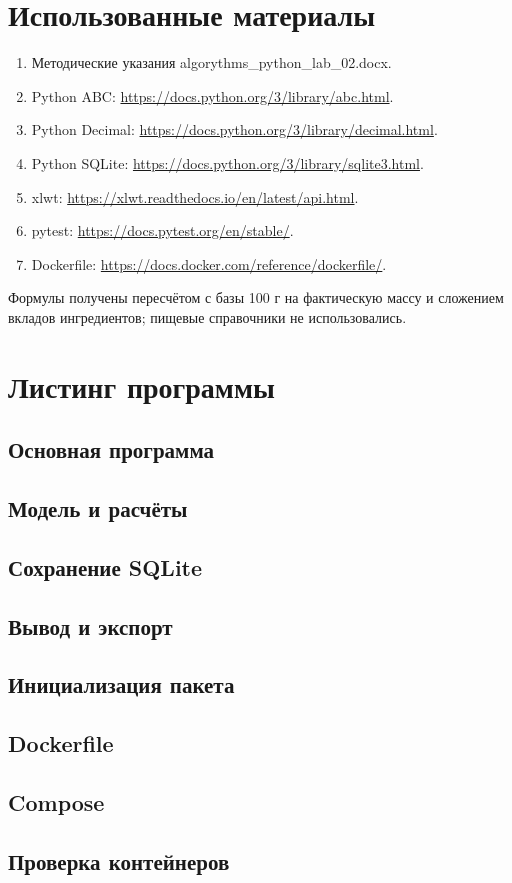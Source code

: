 \documentclass[12pt,a4paper]{article}
\begin{document}
\section{Использованные материалы}
\begin{enumerate}
\item Методические указания algorythms\_python\_lab\_02.docx.
\item Python ABC: \url{https://docs.python.org/3/library/abc.html}.
\item Python Decimal: \url{https://docs.python.org/3/library/decimal.html}.
\item Python SQLite: \url{https://docs.python.org/3/library/sqlite3.html}.
\item xlwt: \url{https://xlwt.readthedocs.io/en/latest/api.html}.
\item pytest: \url{https://docs.pytest.org/en/stable/}.
\item Dockerfile: \url{https://docs.docker.com/reference/dockerfile/}.
\end{enumerate}
Формулы получены пересчётом с базы 100 г на фактическую массу и
сложением вкладов ингредиентов; пищевые справочники не использовались.

\clearpage
\appendix
\section{Листинг программы}
\subsection{Основная программа}
\subsection{Модель и расчёты}
\subsection{Сохранение SQLite}
\subsection{Вывод и экспорт}
\subsection{Инициализация пакета}
\subsection{Dockerfile}
\subsection{Compose}
\subsection{Проверка контейнеров}
\end{document}
